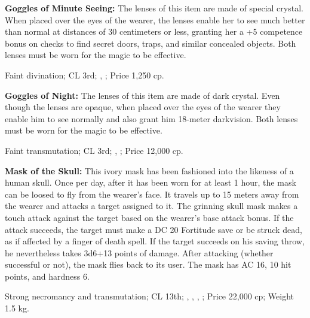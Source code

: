 \textbf{Goggles of Minute Seeing:} The lenses of this item are made of special crystal. When placed over the eyes of the wearer, the lenses enable her to see much better than normal at distances of 30 centimeters or less, granting her a +5 competence bonus on  checks to find secret doors, traps, and similar concealed objects. Both lenses must be worn for the magic to be effective.

Faint divination; CL 3rd; , ; Price 1,250 cp.


\textbf{Goggles of Night:} The lenses of this item are made of dark crystal. Even though the lenses are opaque, when placed over the eyes of the wearer they enable him to see normally and also grant him 18-meter darkvision. Both lenses must be worn for the magic to be effective.

Faint transmutation; CL 3rd; , ; Price 12,000 cp.


\textbf{Mask of the Skull:} This ivory mask has been fashioned into the likeness of a human skull. Once per day, after it has been worn for at least 1 hour, the mask can be loosed to fly from the wearer's face. It travels up to 15 meters away from the wearer and attacks a target assigned to it. The grinning skull mask makes a touch attack against the target based on the wearer's base attack bonus. If the attack succeeds, the target must make a DC 20 Fortitude save or be struck dead, as if affected by a finger of death spell. If the target succeeds on his saving throw, he nevertheless takes 3d6+13 points of damage. After attacking (whether successful or not), the mask flies back to its user. The mask has AC 16, 10 hit points, and hardness 6.

Strong necromancy and transmutation; CL 13th; , , , ; Price 22,000 cp; Weight 1.5 kg.

